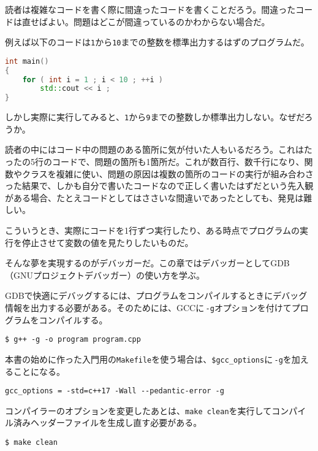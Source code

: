
読者は複雑なコードを書く際に間違ったコードを書くことだろう。間違ったコードは直せばよい。問題はどこが間違っているのかわからない場合だ。

例えば以下のコードは\texttt{1}から\texttt{10}までの整数を標準出力するはずのプログラムだ。

\begin{lstlisting}[language={C++}]
int main()
{
    for ( int i = 1 ; i < 10 ; ++i )
        std::cout << i ;
}
\end{lstlisting}

しかし実際に実行してみると、\texttt{1}から\texttt{9}までの整数しか標準出力しない。なぜだろうか。

読者の中にはコード中の問題のある箇所に気が付いた人もいるだろう。これはたったの5行のコードで、問題の箇所も1箇所だ。これが数百行、数千行になり、関数やクラスを複雑に使い、問題の原因は複数の箇所のコードの実行が組み合わさった結果で、しかも自分で書いたコードなので正しく書いたはずだという先入観がある場合、たとえコードとしてはささいな間違いであったとしても、発見は難しい。

こういうとき、実際にコードを1行ずつ実行したり、ある時点でプログラムの実行を停止させて変数の値を見たりしたいものだ。

そんな夢を実現するのがデバッガーだ。この章ではデバッガーとしてGDB（GNUプロジェクトデバッガー）の使い方を学ぶ。

GDBで快適にデバッグするには、プログラムをコンパイルするときにデバッグ情報を出力する必要がある。そのためには、GCCに\,\texttt{-g}オプションを付けてプログラムをコンパイルする。

\begin{lstlisting}[style=terminal]
$ g++ -g -o program program.cpp
\end{lstlisting}

本書の始めに作った入門用の\texttt{Makefile}を使う場合は、\texttt{\$gcc\_options}に\,\texttt{-g}を加えることになる。

\begin{lstlisting}[style=terminal]
gcc_options = -std=c++17 -Wall --pedantic-error -g
\end{lstlisting}

コンパイラーのオプションを変更したあとは、\texttt{make clean}を実行してコンパイル済みヘッダーファイルを生成し直す必要がある。

\begin{lstlisting}[style=terminal]
$ make clean
\end{lstlisting}

